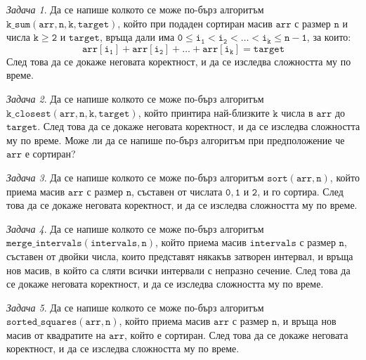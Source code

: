 \documentclass{article}
\theoremstyle{definition}
\theoremstyle{plain}
\theoremstyle{remark}
\newtheorem{problem}{Задача}
\theoremstyle{definition}
\begin{document}
\begin{problem}
Да се напише колкото се може по-бърз алгоритъм $\mathtt{k\_sum(arr, n, k, target)}$, който при подаден сортиран масив $\mathtt{arr}$ с размер $\mathtt{n}$ и числа $\mathtt{k \geq 2}$ и $\mathtt{target}$, връща дали има $\mathtt{0 \leq i_1 < i_2 < \dots < i_k \leq n - 1}$, за които:
\[
    \mathtt{arr[i_1] + arr[i_2] + \dots + arr[i_k] = target}
\]
След това да се докаже неговата коректност, и да се изследва сложността му по време.
\end{problem}

\begin{problem}
Да се напише колкото се може по-бърз алгоритъм $\mathtt{k\_closest(arr, n, k, target)}$, който принтира най-близките $\mathtt{k}$ числа в $\mathtt{arr}$ до $\mathtt{target}$.
След това да се докаже неговата коректност, и да се изследва сложността му по време.
Може ли да се напише по-бърз алгоритъм при предположение че $\mathtt{arr}$ е сортиран?
\end{problem}

\begin{problem}
Да се напише колкото се може по-бърз алгоритъм $\mathtt{sort(arr, n)}$, който приема масив $\mathtt{arr}$ с размер $\mathtt{n}$, съставен от числата $\mathtt{0, 1}$ и $\mathtt{2}$, и го сортира.
След това да се докаже неговата коректност, и да се изследва сложността му по време.
\end{problem}

\begin{problem}
Да се напише колкото се може по-бърз алгоритъм $\mathtt{merge\_intervals(intervals, n)}$, който приема масив $\mathtt{intervals}$ с размер $\mathtt{n}$, съставен от двойки числа, които представят някакъв затворен интервал, и връща нов масив, в който са сляти всички интервали с непразно сечение.
След това да се докаже неговата коректност, и да се изследва сложността му по време.
\end{problem}

\begin{problem}
Да се напише колкото се може по-бърз алгоритъм $\mathtt{sorted\_squares(arr, n)}$, който приема масив $\mathtt{arr}$ с размер $\mathtt{n}$, и връща нов масив от квадратите на $\mathtt{arr}$, който е сортиран.
След това да се докаже неговата коректност, и да се изследва сложността му по време.
\end{problem}
\end{document}

